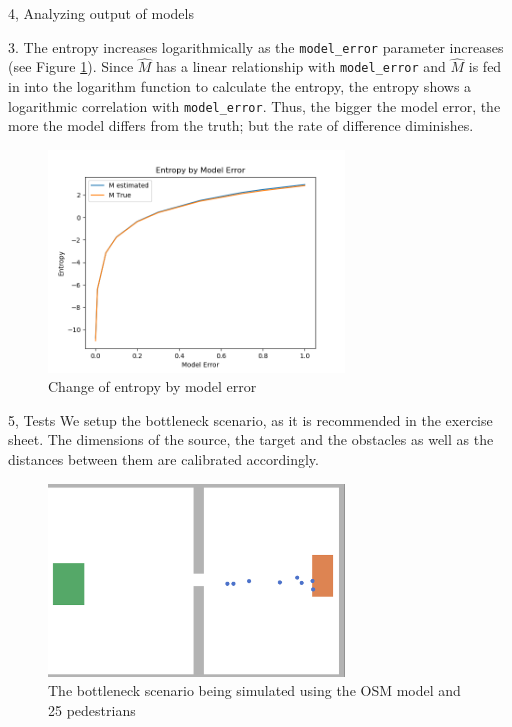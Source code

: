 \documentclass[10pt,a4paper]{article}
\begin{document}
\begin{task}{4, Analyzing output of models}

3. The entropy increases logarithmically as the \texttt{model\_error} parameter increases (see Figure \ref{fig:entropy_change_task4}). Since $\hat{M}$ has a linear relationship with \texttt{model\_error} and $\hat{M}$ is fed in into the logarithm function to calculate the entropy, the entropy shows a logarithmic correlation with \texttt{model\_error}. Thus, the bigger the model error, the more the model differs from the truth; but the rate of difference diminishes. 

\begin{figure}[H]
    \centering
    \includegraphics[width=0.7\textwidth]{pictures/task4/task4_entropy.png}
    \caption{Change of entropy by model error}
    \label{fig:entropy_change_task4}
\end{figure}

\end{task}
\begin{task}{5, Tests}
We setup the bottleneck scenario, as it is recommended in the exercise sheet. The dimensions of the source, the target and the obstacles as well as the distances between them are calibrated accordingly.
\begin{figure}[H]
    \centering
    \includegraphics[width=0.7\textwidth]{pictures/task5/bottleneck.png}
    \caption{The bottleneck scenario being simulated using the OSM model and 25 pedestrians}
    \label{fig:bottleneck_task5}
\end{figure}
\end{task}
\end{document}
